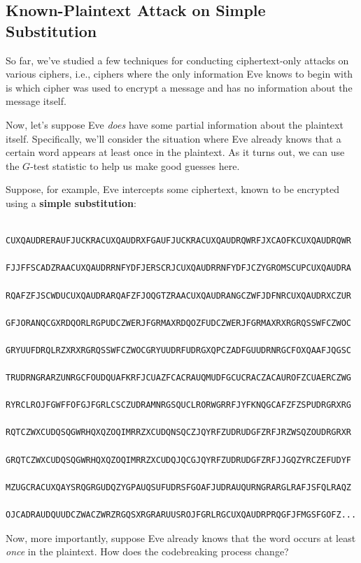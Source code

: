 \documentclass[letterpaper]{article}
\begin{document}
\subsection{Known-Plaintext Attack on Simple Substitution}
So far, we've studied a few techniques for conducting ciphertext-only attacks on various ciphers, i.e., ciphers where the only information Eve knows to begin with is which cipher was used to encrypt a message and has no information about the message itself. 

\bigskip 

Now, let's suppose Eve \emph{does} have some partial information about the plaintext itself. Specifically, we'll consider the situation where Eve already knows that a certain word appears at least once in the plaintext. As it turns out, we can use the $G$-test statistic to help us make good guesses here. 

\bigskip 

Suppose, for example, Eve intercepts some ciphertext, known to be encrypted using a \textbf{simple substitution}:
\begin{verbatim}
    CUXQAUDRERAUFJUCKRACUXQAUDRXFGAUFJUCKRACUXQAUDRQWRFJXCAOFKCUXQAUDRQWR
    FJJFFSCADZRAACUXQAUDRRNFYDFJERSCRJCUXQAUDRRNFYDFJCZYGROMSCUPCUXQAUDRA
    RQAFZFJSCWDUCUXQAUDRARQAFZFJOQGTZRAACUXQAUDRANGCZWFJDFNRCUXQAUDRXCZUR
    GFJORANQCGXRDQORLRGPUDCZWERJFGRMAXRDQOZFUDCZWERJFGRMAXRXRGRQSSWFCZWOC
    GRYUUFDRQLRZXRXRGRQSSWFCZWOCGRYUUDRFUDRGXQPCZADFGUUDRNRGCFOXQAAFJQGSC
    TRUDRNGRARZUNRGCFOUDQUAFKRFJCUAZFCACRAUQMUDFGCUCRACZACAUROFZCUAERCZWG
    RYRCLROJFGWFFOFGJFGRLCSCZUDRAMNRGSQUCLRORWGRRFJYFKNQGCAFZFZSPUDRGRXRG
    RQTCZWXCUDQSQGWRHQXQZOQIMRRZXCUDQNSQCZJQYRFZUDRUDGFZRFJRZWSQZOUDRGRXR
    GRQTCZWXCUDQSQGWRHQXQZOQIMRRZXCUDQJQCGJQYRFZUDRUDGFZRFJJGQZYRCZEFUDYF
    MZUGCRACUXQAYSRQGRGUDQZYGPAUQSUFUDRSFGOAFJUDRAUQURNGRARGLRAFJSFQLRAQZ
    OJCADRAUDQUUDCZWACZWRZRGQSXRGRARUUSROJFGRLRGCUXQAUDRPRQGFJFMGSFGOFZ...\end{verbatim}
Now, more importantly, suppose Eve already knows that the word  occurs at least \emph{once} in the plaintext. How does the codebreaking process change? 
\end{document}
